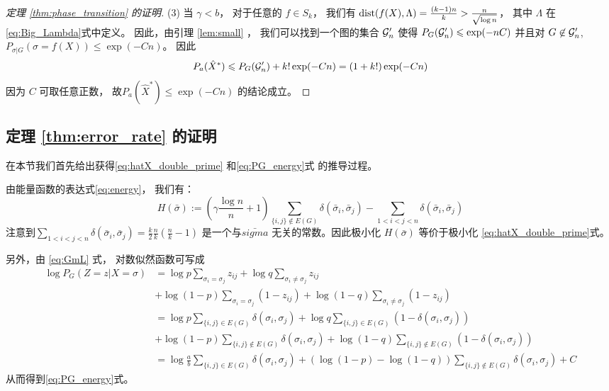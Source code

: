 \begin{proof}[定理 \ref{thm:phase_transition} 的证明]
	(3) 当 $\gamma < b$，
  对于任意的 $f\in S_k$，
  我们有
  $\operatorname{dist}(f(X), \Lambda) = \frac{(k-1)n}{k} > \frac{n}{\sqrt{\log n}}$，
  其中 $\Lambda$ 在\eqref{eq:Big_Lambda}式中定义。
	因此，由引理 \ref{lem:small} ，
  我们可以找到一个图的集合 $\mathcal{G}'_n$
  使得 $P_G(\mathcal{G}'_n) \leqslant \exp(-nC)$
	并且对 $G\not \in \mathcal{G}'_n$, $P_{\sigma |G}(\sigma = f(X)) \leq \exp(-Cn)$。
  因此
	\begin{align*}
	P_a(\hat{X}^*) \leqslant P_G(\mathcal{G}'_n) + k! \exp(-Cn) = (1+k!)\exp(-Cn)
	\end{align*}
	因为 $C$
  可取任意正数，
	故$P_a(\hat{X}^*) \leq \exp(-Cn)$
  的结论成立。
\end{proof}
\subsection{定理 \ref{thm:error_rate} 的证明}
在本节我们首先给出获得\eqref{eq:hatX_double_prime}
和\eqref{eq:PG_energy}式 的推导过程。

由能量函数的表达式\eqref{eq:energy}，
我们有：
\begin{equation}
	H(\bar{\sigma}) := (\gamma \frac{\log n}{n} + 1)\sum_{\{i,j\}\not\in E(G)} \delta(\bar{\sigma}_i, \bar{\sigma}_j)
	- \sum_{1<i<j<n} \delta(\bar{\sigma}_i, \bar{\sigma}_j)
\end{equation}
注意到$\sum_{1<i<j<n} \delta(\bar{\sigma}_i, \bar{\sigma}_j)=\frac{k}{2}\frac{n}{k}(\frac{n}{k}-1)$
是一个与$\bar{sigma}$ 无关的常数。因此极小化
$H(\bar{\sigma}) $ 等价于极小化
\eqref{eq:hatX_double_prime}式。

另外，由 \eqref{eq:GmL} 式，
对数似然函数可写成
\begin{align*}
  \log P_G(Z=z|X=\sigma)
  &= \log p \sum_{\sigma_i = \sigma_j} z_{ij}
  +\log q \sum_{\sigma_i \neq \sigma_j}z_{ij}\\
  &+\log (1-p) \sum_{\sigma_i = \sigma_j}(1-z_{ij})
  +\log (1-q) \sum_{\sigma_i \neq \sigma_j}(1-z_{ij})\\
  &= \log p \sum_{\{i,j\}\in E(G)}
  \delta(\sigma_i, \sigma_j)
  +\log q \sum_{\{i,j\}\in E(G)}(1-\delta(\sigma_i, \sigma_j))\\
  &+\log (1-p) \sum_{\{i,j\}\not\in E(G)}
  \delta(\sigma_i, \sigma_j)
  +\log (1-q) \sum_{\{i,j\}\not\in E(G)}
  (1-\delta(\sigma_i, \sigma_j))\\
  &=\log \frac{a}{b} \sum_{\{i,j\}\in E(G)}
  \delta(\sigma_i, \sigma_j) + (\log(1-p)-\log(1-q))
  \sum_{\{i,j\}\not \in E(G)}
  \delta(\sigma_i, \sigma_j)+ C
\end{align*}
从而得到\eqref{eq:PG_energy}式。

